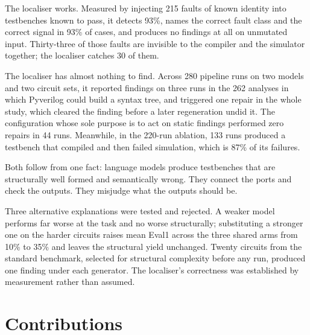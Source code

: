 \documentclass[11pt,a4paper,titlepage=false]{scrreprt}
\begin{document}
The localiser works. Measured by injecting 215 faults of known identity into testbenches
known to pass, it detects 93\%, names the correct fault class and the correct signal in 93\%
of cases, and produces no findings at all on unmutated input. Thirty-three of those faults
are invisible to the compiler and the simulator together; the localiser catches 30 of them.

The localiser has almost nothing to find. Across 280 pipeline runs on two models and two
circuit sets, it reported findings on three runs in the 262 analyses in which Pyverilog could
build a syntax tree, and triggered one repair in the whole study, which cleared the finding
before a later regeneration undid it. The configuration whose sole purpose is to act on static findings performed
zero repairs in 44 runs. Meanwhile, in the 220-run ablation, 133 runs produced a testbench
that compiled and then failed simulation, which is 87\% of its failures.

Both follow from one fact: language models produce testbenches that are structurally well
formed and semantically wrong. They connect the ports and check the outputs. They misjudge
what the outputs should be.

Three alternative explanations were tested and rejected. A weaker model performs far worse at
the task and no worse structurally; substituting a stronger one on the harder circuits raises
mean Eval1 across the three shared arms from 10\% to 35\% and leaves the structural yield
unchanged. Twenty circuits from the
standard benchmark, selected for structural complexity before any run, produced one finding
under each generator. The localiser's correctness was established by measurement rather than
assumed.

\section{Contributions}\label{sec:intro-contrib}
\end{document}
